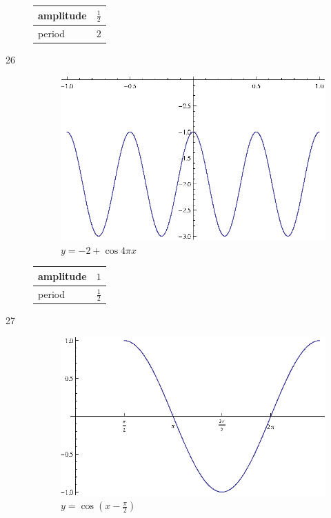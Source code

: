 \documentclass{exam}
\begin{document}
\begin{description}
        \begin{tabular}[H]{lr}
          \toprule
          amplitude & $\frac{1}{2}$ \\
          \midrule
          period & $2$ \\
          \bottomrule
        \end{tabular}

      \item[26]
        \begin{figure}[H]
          \centering
          \includegraphics[scale=0.9]{exercise26.eps}
          \caption{$y = -2 + \cos 4 \pi x$}
        \end{figure}

        \begin{tabular}[H]{lr}
          \toprule
          amplitude & $1$ \\
          \midrule
          period & $\frac{1}{2}$ \\
          \bottomrule
        \end{tabular}

      \item[27]
        \begin{figure}[H]
          \centering
          \includegraphics[scale=0.8]{exercise27.eps}
          \caption{$y = \cos \left( x - \frac{\pi}{2} \right)$}
        \end{figure}


\end{description}
\end{document}
